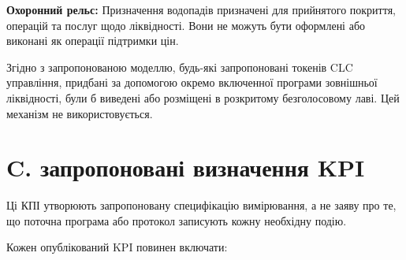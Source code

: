 \documentclass[11pt]{article}
\begin{document}
\textbf{Охоронний рельс:} Призначення водопадів призначені для прийнятого покриття, операцій та послуг щодо ліквідності. Вони не можуть бути оформлені або виконані як операції підтримки цін.

Згідно з запропонованою моделлю, будь-які запропоновані токенів CLC управління, придбані за допомогою окремо включенної програми зовнішньої ліквідності, були б виведені або розміщені в розкритому безголосовому лаві. Цей механізм не використовується.


\section*{C. запропоновані визначення KPI}

Ці КПІ утворюють запропоновану специфікацію вимірювання, а не заяву про те, що поточна програма або протокол записують кожну необхідну подію.

Кожен опублікований KPI повинен включати:
\end{document}
